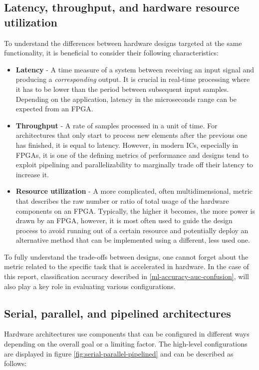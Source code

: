 \subsection{Latency, throughput, and hardware resource utilization}\label{latency-throughput-resources}
To understand the differences between hardware designs targeted at the same functionality, it is beneficial to consider their following characteristics:

\begin{itemize}
  \item \textbf{Latency} - A time measure of a system between receiving an input signal and producing a \textit{corresponding} output. It is crucial in real-time processing where it has to be lower than the period between subsequent input samples. Depending on the application, latency in the microseconds range can be expected from an FPGA.
  \item \textbf{Throughput} - A rate of samples processed in a unit of time. For architectures that only start to process new elements after the previous one has finished, it is equal to latency. However, in modern ICs, especially in FPGAs, it is one of the defining metrics of performance and designs tend to exploit pipelining and parallelizability to marginally trade off their latency to increase it.
  \item \textbf{Resource utilization} - A more complicated, often multidimensional, metric that describes the raw number or ratio of total usage of the hardware components on an FPGA. Typically, the higher it becomes, the more power is drawn by an FPGA, however, it is most often used to guide the design process to avoid running out of a certain resource and potentially deploy an alternative method that can be implemented using a different, less used one.
\end{itemize}

To fully understand the trade-offs between designs, one cannot forget about the metric related to the specific task that is accelerated in hardware. In the case of this report, classification accuracy described in \autoref{ml-accuracy-auc-confusion}, will also play a key role in evaluating various configurations.


\subsection{Serial, parallel, and pipelined architectures}\label{serial-parallel-pipelined}
Hardware architectures use components that can be configured in different ways depending on the overall goal or a limiting factor. The high-level configurations  are displayed in figure \ref{fig:serial-parallel-pipelined} and can be described as follows:

